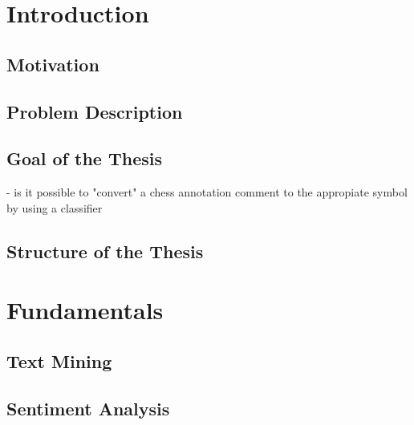 \documentclass[article,type=msc,colorback,accentcolor=tud7b]{tudthesis}
\begin{document}
  \author{Florian Beck}
  \dateofexam{\today}{\today}
  \makethesistitle
  
  
  \clearpage
  
  
  \clearpage
  
  \setcounter{tocdepth}{6}
  \tableofcontents
  \setcounter{page}{6}
  \clearpage
  
  \listoffigures
  \listoftables
  \clearpage
  
  \section{Introduction}

  \subsection{Motivation}

  \subsection{Problem Description}

  \subsection{Goal of the Thesis}
    - is it possible to "convert" a chess annotation comment to the appropiate symbol by using a classifier

  \subsection{Structure of the Thesis}
  \clearpage
  
  \section{Fundamentals}
  
  \subsection{Text Mining}
  
  \subsection{Sentiment Analysis}
\end{document}
